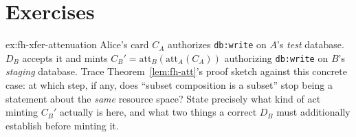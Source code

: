 \documentclass[11pt,a4paper]{article}
\theoremstyle{definition}
\theoremstyle{remark}
\begin{document}
\section{Exercises}
\label{sec:fh-exercises}


\begin{pdexercise}[kind=Trace,rating=2]{ex:fh-xfer-attenuation}
Alice's card $C_A$ authorizes \texttt{db:write} on $A$'s \emph{test} database. $D_B$ accepts it and mints $C_B' = \mathrm{att}_B(\mathrm{att}_A(C_A))$ authorizing \texttt{db:write} on $B$'s \emph{staging} database. Trace Theorem~\ref{lem:fh-att}'s proof sketch against this concrete case: at which step, if any, does ``subset composition is a subset'' stop being a statement about the \emph{same} resource space? State precisely what kind of act minting $C_B'$ actually is here, and what two things a correct $D_B$ must additionally establish before minting it.
\end{pdexercise}
\end{document}
